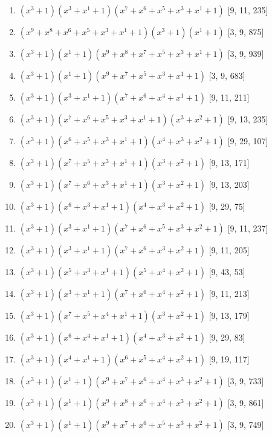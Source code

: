 \documentclass[10pt,twocolumn]{article}
\begin{document}
\begin{enumerate}
\item $(x^{3} + 1)(x^{3} + x^{1} + 1)(x^{7} + x^{6} + x^{5} + x^{3} + x^{1} + 1)$  [9, 11, 235]
\item $(x^{9} + x^{8} + x^{6} + x^{5} + x^{3} + x^{1} + 1)(x^{3} + 1)(x^{1} + 1)$  [3, 9, 875]
\item $(x^{3} + 1)(x^{1} + 1)(x^{9} + x^{8} + x^{7} + x^{5} + x^{3} + x^{1} + 1)$  [3, 9, 939]
\item $(x^{3} + 1)(x^{1} + 1)(x^{9} + x^{7} + x^{5} + x^{3} + x^{1} + 1)$  [3, 9, 683]
\item $(x^{3} + 1)(x^{3} + x^{1} + 1)(x^{7} + x^{6} + x^{4} + x^{1} + 1)$  [9, 11, 211]
\item $(x^{3} + 1)(x^{7} + x^{6} + x^{5} + x^{3} + x^{1} + 1)(x^{3} + x^{2} + 1)$  [9, 13, 235]
\item $(x^{3} + 1)(x^{6} + x^{5} + x^{3} + x^{1} + 1)(x^{4} + x^{3} + x^{2} + 1)$  [9, 29, 107]
\item $(x^{3} + 1)(x^{7} + x^{5} + x^{3} + x^{1} + 1)(x^{3} + x^{2} + 1)$  [9, 13, 171]
\item $(x^{3} + 1)(x^{7} + x^{6} + x^{3} + x^{1} + 1)(x^{3} + x^{2} + 1)$  [9, 13, 203]
\item $(x^{3} + 1)(x^{6} + x^{3} + x^{1} + 1)(x^{4} + x^{3} + x^{2} + 1)$  [9, 29, 75]
\item $(x^{3} + 1)(x^{3} + x^{1} + 1)(x^{7} + x^{6} + x^{5} + x^{3} + x^{2} + 1)$  [9, 11, 237]
\item $(x^{3} + 1)(x^{3} + x^{1} + 1)(x^{7} + x^{6} + x^{3} + x^{2} + 1)$  [9, 11, 205]
\item $(x^{3} + 1)(x^{5} + x^{3} + x^{1} + 1)(x^{5} + x^{4} + x^{2} + 1)$  [9, 43, 53]
\item $(x^{3} + 1)(x^{3} + x^{1} + 1)(x^{7} + x^{6} + x^{4} + x^{2} + 1)$  [9, 11, 213]
\item $(x^{3} + 1)(x^{7} + x^{5} + x^{4} + x^{1} + 1)(x^{3} + x^{2} + 1)$  [9, 13, 179]
\item $(x^{3} + 1)(x^{6} + x^{4} + x^{1} + 1)(x^{4} + x^{3} + x^{2} + 1)$  [9, 29, 83]
\item $(x^{3} + 1)(x^{4} + x^{1} + 1)(x^{6} + x^{5} + x^{4} + x^{2} + 1)$  [9, 19, 117]
\item $(x^{3} + 1)(x^{1} + 1)(x^{9} + x^{7} + x^{6} + x^{4} + x^{3} + x^{2} + 1)$  [3, 9, 733]
\item $(x^{3} + 1)(x^{1} + 1)(x^{9} + x^{8} + x^{6} + x^{4} + x^{3} + x^{2} + 1)$  [3, 9, 861]
\item $(x^{3} + 1)(x^{1} + 1)(x^{9} + x^{7} + x^{6} + x^{5} + x^{3} + x^{2} + 1)$  [3, 9, 749]

\end{enumerate}
\end{document}
